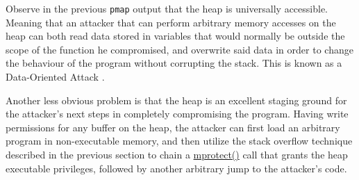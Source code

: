 Observe in the previous \texttt{pmap} output that the heap is universally
accessible. Meaning that an attacker that can perform arbitrary memory accesses
on the heap can both read data stored in variables that would normally be
outside the scope of the function he compromised, and overwrite said data in
order to change the behaviour of the program without corrupting the stack. This
is known as a Data-Oriented Attack \cite{cheng2019exploitation}.

Another less obvious problem is that the heap is an excellent staging ground
for the attacker's next steps in completely compromising the program. Having
write permissions for any buffer on the heap, the attacker can first load an
arbitrary program in non-executable memory, and then utilize the stack overflow
technique described in the previous section to chain a
\href{https://man7.org/linux/man-pages/man2/mprotect.2.html}{mprotect()} call
that grants the heap executable privileges, followed by another arbitrary jump
to the attacker's code.

